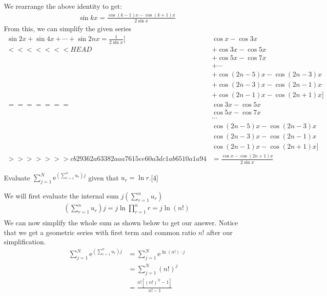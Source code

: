 \documentclass[12pt, a4 paper]{article}
\begin{document}
\begin{outline}[enumerate]
 \begin{answer}
   We rearrange the above identity to get:
   \begin{align*}
     \sin{kx} = \frac{\cos{(k-1)x}-\cos{(k+1)x}}{2\sin x}
   \end{align*}
   From this, we can simplify the given series
   \begin{align*}
     \sin{2x}+\sin{4x}+\cdots+\sin{2nx} = \frac{1}{2\sin x}[& \cos x - \cos 3x \\
<<<<<<< HEAD
     & +\cos 3x - \cos 5x \\
     & +\cos5x - \cos 7x \\
     & +\cdots \\
     & +\cos{(2n-5)x} - \cos{(2n-3)x} \\
     & +\cos{(2n-3)x} - \cos{(2n-1)x} \\
     & +\cos{(2n-1)x} - \cos{(2n+1)x}] \\
=======
     & \cos 3x - \cos 5x \\
     & \cos5x - \cos 7x \\
     & \cdots \\
     & \cos{(2n-5)x} - \cos{(2n-3)x} \\
     & \cos{(2n-3)x} - \cos{(2n-1)x} \\
     & \cos{(2n-1)x} - \cos{(2n+1)x}] \\
>>>>>>> cb29362a63382aaa7615ee60a3dc1ab6510a1a94
     &= \frac{\cos x - \cos{(2n+1)x}}{2\sin x}
   \end{align*}
 \end{answer}

 \1 Evaluate \(\sum\limits_{j=1}^{N}\mathrm{e}^{\left(\sum\limits_{r=1}^{n}u_{r}\right)j}\) given that \(u_{r}=\ln{r}\).\hfill[4]%
 \begin{answer}
  We will first evaluate the internal sum \(j\left(\sum\limits_{r=1}^{n}u_{r}\right)\)
  \begin{align*}
   (\sum\limits_{r=1}^{n}u_{r})j= j\ln\prod_{r=1}^n r = j\ln{(n!)} \\
  \end{align*}
  We can now simplify the whole sum as shown below to get our answer. Notice that we get a geometric series with first term and common ratio \(n! \) after our simplification.
  \begin{align*}
   \sum\limits_{j=1}^{N}\mathrm{e}^{\left(\sum\limits_{r=1}^{n}u_{r}\right)j} & =      \sum\limits_{j=1}^{N}\mathrm{e}^{\ln(n!) \cdot j} \\
                                                                              & = \sum\limits_{j=1}^{N}{(n!)}^j                          \\
                                                                              & = \frac{n![{(n!)}^N-1]}{n!-1}
  \end{align*}
 \end{answer}
\end{outline}
\end{document}
